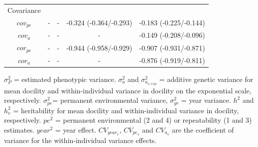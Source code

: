 \documentclass[a4paper,12pt,twoside]{article}
\begin{document}
\begin{table}[ht!]
\begin{tabular}{c c c c c}
			Covariance & & & &\\
			$cov_{pe}$ & - & - & -0.324 (-0.364/-0.293) & -0.183 (-0.225/-0.144)\\
			$cov_{a}$ & - & - & - & -0.149 (-0.208/-0.096)\\
			$cor_{pe}$ & - & - & -0.944 (-0.958/-0.929) & -0.907 (-0.931/-0.871)\\
			$cor_{a}$ & - & - & - & -0.876 (-0.919/-0.811)\\
			\hline
		\end{tabular}
		\begin{tablenotes}
			\small
			\item $\sigma_P^2$ = estimated phenotypic variance.
			$\sigma_a^2$ and $\sigma_{a_{v, exp}}^2$ = additive genetic variance for mean docility and within-individual variance in docility on the exponential scale, respectively. 
			$\sigma_{pe}^2$= permanent environmental variance, $\sigma_{yr}^2$ = year variance. 
			$h^2$ and $h_v^2$ = heritability for mean docility and within-individual variance in docility, respectively. 
			$pe^2$ = permanent environmental (2 and 4) or repeatability (1 and 3) estimates. 
			$year^2$ = year effect.
			$CV_{year_v}$, $CV_{pe_v}$ and $CV_{a_v}$ are the coefficient of variance for the within-individual variance effects.
		\end{tablenotes}
	\end{table}
	
	
	
	
	\newpage
\end{document}
